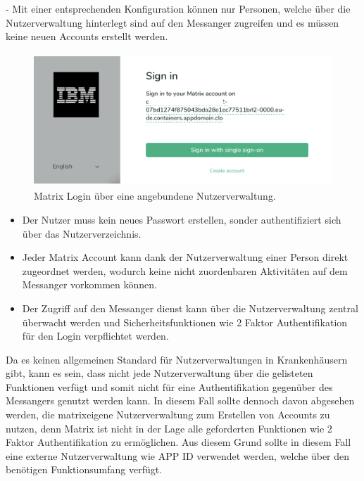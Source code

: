 - Mit einer entsprechenden Konfiguration können nur Personen, welche über die Nutzerverwaltung hinterlegt sind auf den Messanger zugreifen und es müssen keine neuen Accounts erstellt werden. 

\begin{figure}[htb]
    \centering
    \includegraphics[height=5cm]{graphics/sso.png}
    \caption[Matrix Login über eine angebundene Nutzerverwaltung]{Matrix Login über eine angebundene Nutzerverwaltung.\footnotemark}
    \label{abb:DHBWLogo}
\end{figure}

\begin{itemize}
    \item Der Nutzer muss kein neues Passwort erstellen, sonder authentifiziert sich über das Nutzerverzeichnis.
    \item Jeder Matrix Account kann dank der Nutzerverwaltung einer Person direkt zugeordnet werden, wodurch keine nicht zuordenbaren Aktivitäten auf dem Messanger vorkommen können.  
    \item Der Zugriff auf den Messanger 
dienst kann über die Nutzerverwaltung zentral überwacht werden und Sicherheitsfunktionen wie 2 Faktor Authentifikation für den Login verpflichtet werden. 
\end{itemize}

Da es keinen allgemeinen Standard für Nutzerverwaltungen in Krankenhäusern gibt, kann es sein, dass nicht jede Nutzerverwaltung über die gelisteten Funktionen verfügt und somit nicht für eine Authentifikation gegenüber des Messangers genutzt werden kann. In diesem Fall sollte dennoch davon abgesehen werden, die matrixeigene Nutzerverwaltung zum Erstellen von Accounts zu nutzen, denn Matrix ist nicht in der Lage alle geforderten Funktionen wie 2 Faktor Authentifikation zu ermöglichen. Aus diesem Grund sollte in diesem Fall eine externe Nutzerverwaltung wie APP ID verwendet werden, welche über den benötigen Funktionsumfang verfügt.

